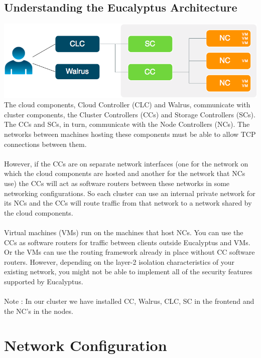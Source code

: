 \section{Understanding the Eucalyptus Architecture}
\includegraphics[scale=0.75]{euca-arch.png} 
\linebreak
The cloud components, Cloud Controller (CLC) and Walrus, communicate with cluster components, the Cluster Controllers (CCs) and Storage Controllers (SCs). The CCs and SCs, in turn, communicate with the Node Controllers (NCs). The networks between machines hosting these components must be able to allow TCP connections between them.
\\ \\
However, if the CCs are on separate network interfaces (one for the network on which the cloud components are hosted and another for the network that NCs use) the CCs will act as software routers between these networks in some networking configurations. So each cluster can use an internal private network for its NCs and the CCs will route traffic from that network to a network shared by the cloud components.
\\ \\
Virtual machines (VMs) run on the machines that host NCs. You can use the CCs as software routers for traffic between clients outside Eucalyptus and VMs. Or the VMs can use the routing framework already in place without CC software routers. However, depending on the layer-2 isolation characteristics of your existing network, you might not be able to implement all of the security features supported by Eucalyptus. 
\\ \\
Note : In our cluster we have installed CC, Walrus, CLC, SC in the frontend and the NC’s in the nodes.




\chapter{Network Configuration}

